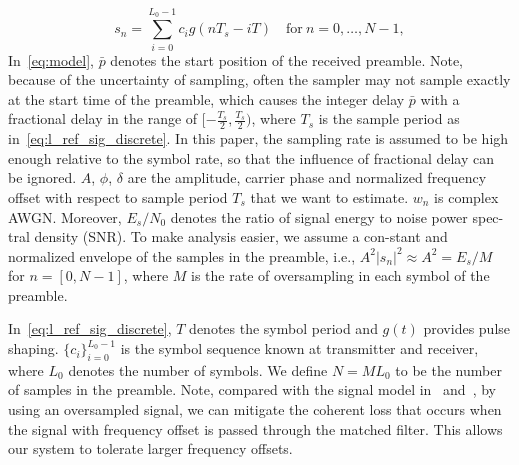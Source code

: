 \begin{equation}
    \label{eq:l_ref_sig_discrete}
    s_n=\sum_{i=0}^{L_0-1} c_i g(nT_s-iT) \quad \text{for}~n=0,\ldots,N-1, 
  \end{equation}
In~\eqref{eq:model}, $\bar{p}$ denotes the start position of the received preamble.
Note, because of the uncertainty of sampling, often the sampler may not sample exactly at the start time of the preamble, which causes
the integer delay $\bar{p}$ with a fractional delay in the range of $[-\frac{T_s}{2},\frac{T_s}{2})$, where $T_s$ is the sample period as in~\eqref{eq:l_ref_sig_discrete}.
In this paper, the sampling rate is assumed to be high enough relative to the symbol rate, so that the influence of fractional delay can be ignored.
$A$, $\phi$, $\delta$ are the amplitude, carrier phase and normalized
frequency offset with respect to sample period $T_s$ that we want to estimate.
$w_n$ is complex AWGN. Moreover,
$E_s/N_0$ denotes the ratio of signal energy to noise power spec-tral density (SNR).
To make analysis easier, we assume a con-stant and normalized envelope of the samples in the 
preamble, i.e., $A^2|s_n|^2\approx A^2=E_s/M$ for $n=[0,N-1]$, where $M$ is the rate
of oversampling in each symbol of the preamble.

In~\eqref{eq:l_ref_sig_discrete}, $T$ denotes the symbol period and $g(t)$ provides pulse shaping.
$\{c_i\}_{i=0}^{L_0-1}$ is the symbol sequence known at transmitter and receiver, where $L_0$ denotes the number of symbols.
We define $N=ML_0$ to be the number of samples in the preamble.
Note, compared with the signal model in~\cite{Morelli_Mengali_98} and~\cite{Ramakrishnan_10}, 
by using an oversampled signal, we can mitigate the coherent loss that occurs
when the signal with frequency offset is passed through the matched filter.
This allows our system to tolerate larger frequency offsets.



